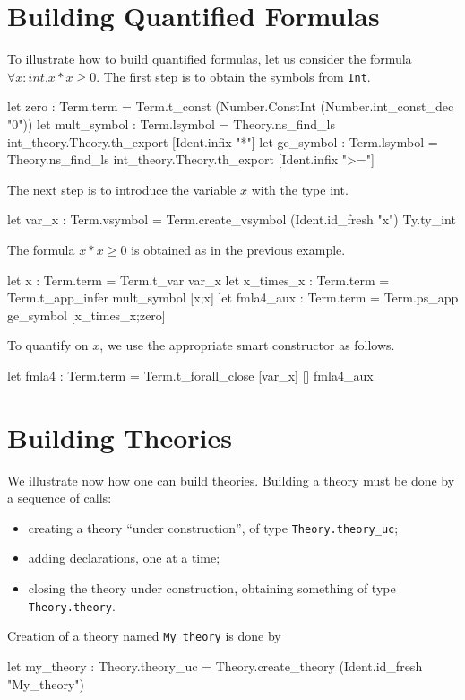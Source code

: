 \section{Building Quantified Formulas}

To illustrate how to build quantified formulas, let us consider
the formula $\forall x:int. x*x \geq 0$. The first step is to
obtain the symbols from \texttt{Int}.
\begin{ocamlcode}
let zero : Term.term =
  Term.t_const (Number.ConstInt (Number.int_const_dec "0"))
let mult_symbol : Term.lsymbol =
  Theory.ns_find_ls int_theory.Theory.th_export [Ident.infix "*"]
let ge_symbol : Term.lsymbol =
  Theory.ns_find_ls int_theory.Theory.th_export [Ident.infix ">="]
\end{ocamlcode}
The next step is to introduce the variable $x$ with the type int.
\begin{ocamlcode}
let var_x : Term.vsymbol =
  Term.create_vsymbol (Ident.id_fresh "x") Ty.ty_int
\end{ocamlcode}
The formula $x*x \geq 0$ is obtained as in the previous example.
\begin{ocamlcode}
let x : Term.term = Term.t_var var_x
let x_times_x : Term.term = Term.t_app_infer mult_symbol [x;x]
let fmla4_aux : Term.term = Term.ps_app ge_symbol [x_times_x;zero]
\end{ocamlcode}
To quantify on $x$, we use the appropriate smart constructor as follows.
\begin{ocamlcode}
let fmla4 : Term.term = Term.t_forall_close [var_x] [] fmla4_aux
\end{ocamlcode}

\section{Building Theories}

We illustrate now how one can build theories. Building a theory must
be done by a sequence of calls:
\begin{itemize}
\item creating a theory ``under construction'', of type \verb|Theory.theory_uc|;
\item adding declarations, one at a time;
\item closing the theory under construction, obtaining something of type \verb|Theory.theory|.
\end{itemize}

Creation of a theory named \verb|My_theory| is done by
\begin{ocamlcode}
let my_theory : Theory.theory_uc =
  Theory.create_theory (Ident.id_fresh "My_theory")
\end{ocamlcode}

